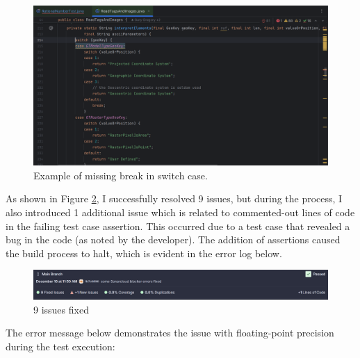 \documentclass[a4paper,12pt]{report}
\begin{document}
\begin{figure}[H]
    \centering
    \includegraphics[width=1\textwidth]{Report_Img/break_issue.png}
    \caption{Example of missing break in switch case.}
    \label{fig:missing_break_issue}
\end{figure}

As shown in Figure \ref{fig:fixed_issues}, I successfully resolved 9 issues, but during the process, I also introduced 1 additional issue which is related to commented-out lines of code in the failing test case assertion. This occurred due to a test case that revealed a bug in the code (as noted by the developer). The addition of assertions caused the build process to halt, which is evident in the error log below.

\begin{figure}[H]
    \centering
    \includegraphics[width=1\textwidth]{Report_Img/issues_fixed.png}
    \caption{9 issues fixed}
    \label{fig:fixed_issues}
\end{figure}

The error message below demonstrates the issue with floating-point precision during the test execution:
\end{document}
